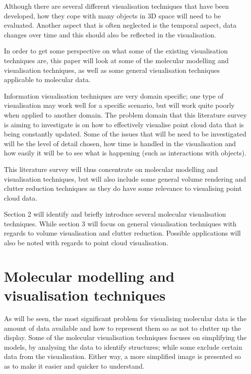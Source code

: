 \documentclass[a4paper]{article}
\begin{document}
Although there are several different visualisation techniques that have been
developed, how they cope with many objects in 3D space will need to be
evaluated. Another aspect that is often neglected is the temporal aspect, data
changes over time and this should also be reflected in the visualisation.

In order to get some perspective on what some of the existing visualisation
techniques are, this paper will look at some of the molecular modelling and
visualisation techniques, as well as some general visualisation techniques
applicable to molecular data.

Information visualisation techniques are very domain specific; one type of
visualisation may work well for a specific scenario, but will work quite poorly
when applied to another domain. The problem domain that this literature survey
is aiming to investigate is on how to effectively visualise point cloud data
that is being constantly updated. Some of the issues that will be need to be
investigated will be the level of detail chosen, how time is handled in the
visualisation and how easily it will be to see what is happening (such as
interactions with objects).

This literature survey will thus concentrate on molecular modelling and
visualisation techniques, but will also include some general volume rendering
and clutter reduction techniques as they do have some relevance to visualising
point cloud data.

Section 2 will identify and briefly introduce several molecular visualisation
techniques. While section 3 will focus on general visualisation techniques with
regards to volume visualisation and clutter reduction. Possible applications
will also be noted with regards to point cloud visualisation.


\section{Molecular modelling and visualisation techniques}

As will be seen, the most significant problem for visualising molecular data is
the amount of data available and how to represent them so as not to clutter up
the display. Some of the molecular visualisation techniques focuses on
simplifying the models, by analysing the data to identify structures; while some
exclude certain data from the visualisation. Either way, a more simplified image
is presented so as to make it easier and quicker to understand.
\end{document}
